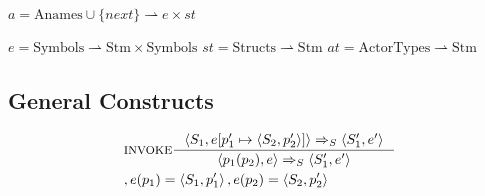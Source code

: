 $a = \text{Anames} \cup \{next\} \rightharpoonup e \times st$

$e = \text{Symbols} \rightharpoonup \text{Stm} \times \text{Symbols}$
$st = \text{Structs} \rightharpoonup \text{Stm}$
$at = \text{ActorTypes} \rightharpoonup \text{Stm}$

\subsection{General Constructs}
\begin{align*}
&\inference[$\text{INVOKE}$]{\Braket{S_1,e[p_1' \mapsto \Braket{S_2,p_2'}]} \Rightarrow_S \Braket{S_1',e'}}
                  {\Braket{p_1(p_2),e} \Rightarrow_S \Braket{S_1',e'}}
\\
&									{,e(p_1) = \Braket{S_1,p_1'}, e(p_2) = \Braket{S_2,p_2'}}
\end{align*}



















